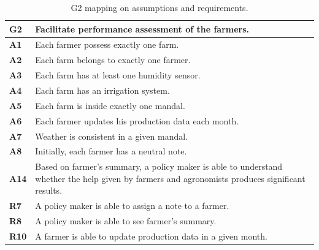 \begin{table}[H]
    \centering
    \begin{tabularx}{\linewidth}{lX} \toprule
         \textbf{G2} & Facilitate performance assessment of the farmers. \\ \midrule
         \textbf{A1} & Each farmer possess exactly one farm. \\ 
         \textbf{A2} & Each farm belongs to exactly one farmer. \\
         \textbf{A3} & Each farm has at least one humidity sensor.\\
         \textbf{A4} & Each farm has an irrigation system.\\
         \textbf{A5} & Each farm is inside exactly one mandal. \\
         \textbf{A6} & Each farmer updates his production data each month. \\
         \textbf{A7} & Weather is consistent in a given mandal.\\
         \textbf{A8} & Initially, each farmer has a neutral note.\\
         \textbf{A14} & Based on farmer's summary, a policy maker is able to understand whether the help given by farmers and agronomists produces significant results.\\ 
         \midrule
         \textbf{R7} & A policy maker is able to assign a note to a farmer. \\
		\textbf{R8} & A policy maker is able to see farmer's summary. \\
		\textbf{R10} & A farmer is able to update production data in a given month.\\
		\bottomrule
    \end{tabularx}
    \caption{G2 mapping on assumptions and requirements.}
\end{table}

